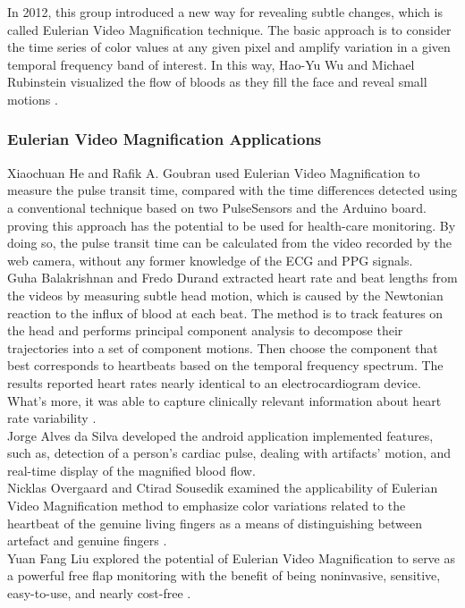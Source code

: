 In 2012, this group introduced a new way for revealing subtle changes, which is called Eulerian Video Magnification technique. The basic approach is to consider the time series of color values at any given pixel and amplify variation in a given temporal frequency band of interest. In this way, Hao-Yu Wu and Michael Rubinstein visualized the flow of bloods as they fill the face and reveal small motions \cite{Rubinstein}.\\

\subsubsection{Eulerian Video Magnification Applications}
Xiaochuan He and Rafik A. Goubran used Eulerian Video Magnification to measure the pulse transit time,  compared with the time differences detected using a conventional technique based on two PulseSensors and the Arduino board.  proving this approach has the potential to be used for health-care monitoring\cite{Goubran}. By doing so, the pulse transit time can be calculated from the video recorded by the web camera, without any former
knowledge of the ECG and PPG signals.\\

Guha Balakrishnan and Fredo Durand extracted heart rate and beat lengths from the videos by measuring subtle head motion, which is caused by the Newtonian reaction to the influx of blood at each beat. The method is to track features on the head and performs principal component analysis to decompose their trajectories into a set of component motions. Then choose the component that best corresponds to heartbeats based on the temporal frequency spectrum. The results reported heart rates nearly identical
to an electrocardiogram device. What's more, it was able to capture clinically relevant information about heart
rate variability \cite{Balakrishnan}.\\

Jorge Alves da Silva developed the android application implemented features, such as, detection of a person’s cardiac pulse, dealing with artifacts’ motion, and real-time display of the magnified blood flow\cite{android}.\\

Nicklas Overgaard and  Ctirad Sousedik examined the applicability of Eulerian Video Magnification method to emphasize color variations related to the heartbeat of the genuine living fingers as a means of distinguishing between  artefact and genuine fingers \cite{Overgaard}.\\

Yuan Fang Liu explored the potential of Eulerian Video Magnification to serve as a powerful free flap monitoring  with the benefit of being noninvasive, sensitive, easy-to-use, and nearly cost-free \cite{walker}.








